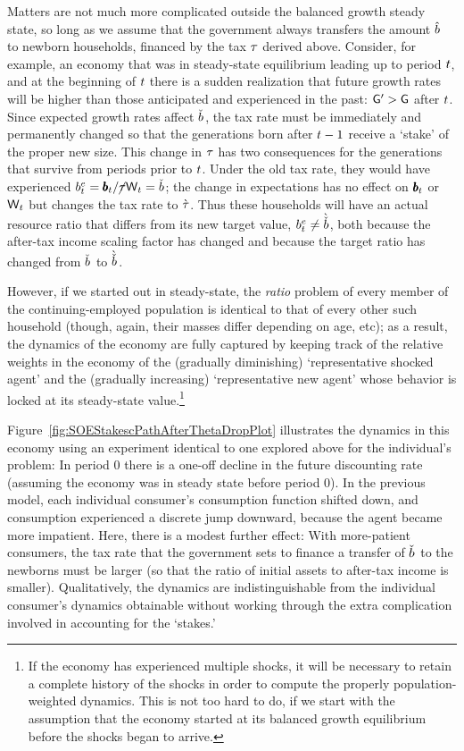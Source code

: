 \message{ !name(TractableBufferStock.tex)}\documentclass{handout}
\begin{document}
Matters are not much more complicated outside the balanced growth
steady state, so long as we assume that the government always
transfers the amount $\hat{b}^{\null}$ to newborn households, financed by
the tax $\tau$ derived above.  Consider, for example, an economy that
was in steady-state equilibrium leading up to period $t$, and at
the beginning of $t$ there is a sudden realization that future
growth rates will be higher than those anticipated and experienced in
the past: $\mathsf{G}^{\prime} > \mathsf{G}$ after $t$.  Since expected
growth rates affect $\bTarg^{\null}$, the tax rate must be immediately and
permanently changed so that the generations born after $t-1$
receive a `stake' of the proper new size.  This change in $\tau$ has
two consequences for the generations that survive from periods prior
to $t$.  Under the old tax rate, they would have experienced
$\bE_{t} = \bLev_{t}/\TaxFree\Wage_{t} = \bTarg^{\null}$; the change in
expectations has no effect on $\pmb{b}_{t}$ or $\mathsf{W}_{t}$ but changes
the tax rate to $\grave{\tau}$.  Thus these households will have an
actual resource ratio that differs from its new target value, $\bE_{t}
\neq \Alt{\bTarg}^{\null}$, both because the after-tax income scaling factor
has changed and because the target ratio has changed from $\bTarg^{\null}$
to $\Alt{\bTarg}^{\null}$.

However, if we started out in steady-state, the {\it ratio} problem of every
member of the continuing-employed population is identical to that of every 
other such household (though, again, their masses differ depending on age, etc); as a result, the dynamics of the economy are fully captured
by keeping track of the relative weights in the economy of the (gradually diminishing) `representative shocked agent' and the (gradually increasing) `representative new agent' 
whose behavior is locked at its steady-state value.\footnote{
If the economy has experienced multiple shocks, it will be necessary to
retain a complete history of the shocks in order to compute the properly 
population-weighted dynamics.  This is not too hard to do, if we start with
the assumption that the economy started at its balanced growth equilibrium before the shocks began to arrive.}

Figure~\ref{fig:SOEStakescPathAfterThetaDropPlot} illustrates the
dynamics in this economy using an experiment identical to one explored
above for the individual's problem: In period 0 there is a one-off
decline in the future discounting rate (assuming the economy was in
steady state before period 0).  In the previous model, each individual
consumer's consumption function shifted down, and consumption
experienced a discrete jump downward, because the agent became more
impatient.  Here, there is a modest further effect: With
more-patient consumers, the tax rate that the government sets to finance a transfer
of $\bTarg^{\null}$ to the newborns must be larger (so that the ratio of initial assets to
after-tax income is smaller).  Qualitatively, the
dynamics are indistinguishable from the individual consumer's dynamics
obtainable without working through the extra complication involved in
accounting for the `stakes.'
\end{document}
